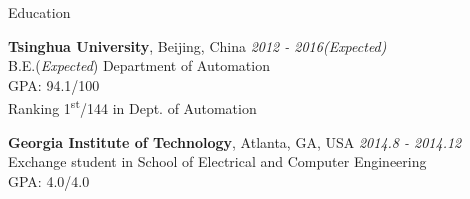 \documentclass{resume} %
\begin{document}

\begin{rSection}{Education}

{\bf Tsinghua University}, Beijing, China \hfill {\em 2012 - 2016(Expected)} \\ 
B.E.({\it Expected}) Department of Automation \\
GPA: 94.1/100\\
Ranking 1\textsuperscript{st}/144 in Dept. of Automation

{\bf Georgia Institute of Technology}, Atlanta, GA, USA \hfill {\em 2014.8 - 2014.12} \\ 
Exchange student in School of Electrical and Computer Engineering\\
GPA: 4.0/4.0


\end{rSection}

\end{document}
